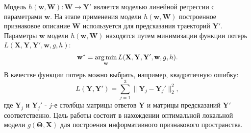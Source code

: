 \documentclass[12pt,twoside]{article}
\begin{document}
Модель $h(\mathbf{w}, \mathbf{W}): \mathbf{W}\to\mathbf{Y}'$ является моделью линейной регрессии с параметрами $\mathbf{w}$. На этапе применения модели $h(\mathbf{w}, \mathbf{W})$ построенное признаковое описание $\mathbf{W}$ используется для предсказания траекторий $\mathbf{Y}'$.
Параметры $\mathbf{w}$ модели $h(\mathbf{w}, \mathbf{W})$ находятся путем минимизации функции потерь $L(\mathbf{X}, \mathbf{Y}, \mathbf{Y}', \mathbf{w}, g, h)$:
\begin{equation}
\mathbf{w^*} = \argmin_{\mathbf{w}} L(\mathbf{X}, \mathbf{Y}, \mathbf{Y}', \mathbf{w}, g, h).
\end{equation}
В качестве функции потерь можно выбрать, например, квадратичную ошибку:
\begin{equation}
L(\mathbf{Y}, \mathbf{Y}') = \sum_{j=1}^{3}\|\mathbf{Y}_j-\mathbf{Y}_j'\|^2_2,
\end{equation}
где $\mathbf{Y}_j$ и $\mathbf{Y}_j'$ - $j$-е столбцы матрицы ответов $\mathbf{Y}$ и матрицы предсказаний $\mathbf{Y}'$ соответственно.
Цель работы состоит в нахождении оптимальной локальной модели $g(\mathbf{\Theta}, \mathbf{X})$ для построения информативного признакового пространства.




\newpage


\end{document}
